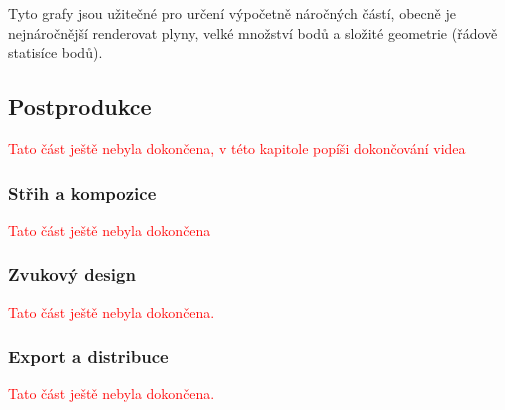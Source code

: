 {Tyto grafy jsou užitečné pro určení výpočetně náročných částí, obecně je nejnáročnější renderovat plyny, velké množství bodů a složité geometrie (řádově statisíce bodů).}

\newpage

\subsection{Postprodukce}
\textcolor{red}{Tato část ještě nebyla dokončena, v této kapitole popíši dokončování videa}

\subsubsection{Střih a kompozice}
\textcolor{red}{Tato část ještě nebyla dokončena}

\subsubsection{Zvukový design}
\textcolor{red}{Tato část ještě nebyla dokončena.}

\subsubsection{Export a distribuce}
\textcolor{red}{Tato část ještě nebyla dokončena.}